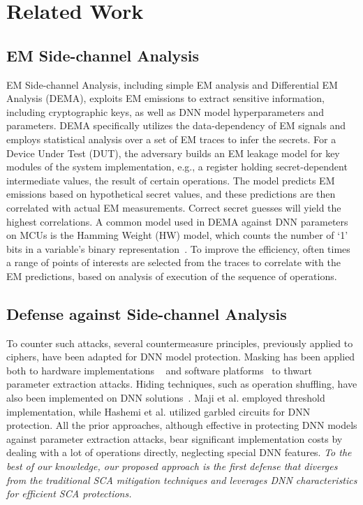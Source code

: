 \section{Related Work}

\subsection{EM Side-channel Analysis}
EM Side-channel Analysis, including simple EM analysis and Differential EM Analysis (DEMA), exploits EM emissions to extract sensitive information, including cryptographic keys, as well as DNN model hyperparameters and parameters.
DEMA specifically utilizes the data-dependency of EM signals and employs statistical analysis over a set of EM traces to infer the secrets.
For a Device Under Test (DUT), the adversary builds an EM leakage model for key modules of the system implementation, e.g., a register holding secret-dependent intermediate values, the result of certain operations.
The model predicts EM emissions based on hypothetical secret values, and these predictions are then correlated with actual EM measurements.  
Correct secret guesses will yield the highest correlations. 
A common model used in DEMA against DNN parameters on MCUs is the Hamming Weight (HW) model, which counts the number of `1' bits in a variable's binary representation~\cite{batina2019csi}. To improve the efficiency, often times a range of points of interests are selected from the traces to correlate with the EM predictions, based on analysis of execution of the sequence of operations. 

\subsection{Defense against Side-channel Analysis}
To counter such attacks, several countermeasure principles, previously applied to ciphers, have been adapted for DNN model protection. Masking has been applied both to hardware implementations ~\cite{dubey2020maskednet} and software platforms~\cite{popets2022} to thwart parameter extraction attacks. Hiding techniques, such as operation shuffling, have also been implemented on DNN solutions~\cite{dubey2022guarding,brosch2022counteract}. Maji et al.\cite{maji2022threshold} employed threshold implementation, while Hashemi et al.\cite{hashemi2022hwgn} utilized garbled circuits for DNN protection. All the prior approaches, although effective in protecting DNN models against parameter extraction attacks, bear significant implementation costs by dealing with a lot of operations directly, neglecting special DNN features.
\emph{To the best of our knowledge, our proposed approach is the first defense that diverges from the traditional SCA mitigation techniques and leverages DNN characteristics for efficient SCA protections.
}
